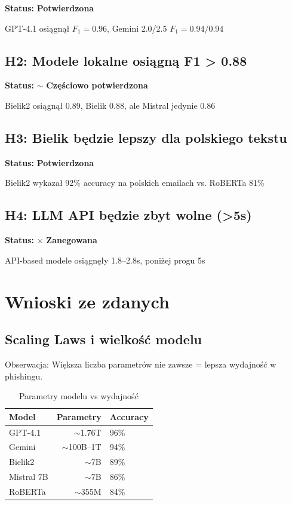 \documentclass[11pt]{extreport}
\begin{document}
\textbf{Status:} \checkmark \textbf{Potwierdzona}

GPT-4.1 osiągnął $F_1 = 0.96$, Gemini 2.0/2.5 $F_1 = 0.94/0.94$

\subsection{H2: Modele lokalne osiągną F1 > 0.88}

\textbf{Status:} $\sim$ \textbf{Częściowo potwierdzona}

Bielik2 osiągnął 0.89, Bielik 0.88, ale Mistral jedynie 0.86

\subsection{H3: Bielik będzie lepszy dla polskiego tekstu}

\textbf{Status:} \checkmark \textbf{Potwierdzona}

Bielik2 wykazał 92\% accuracy na polskich emailach vs. RoBERTa 81\%

\subsection{H4: LLM API będzie zbyt wolne (>5s)}

\textbf{Status:} $\times$ \textbf{Zanegowana}

API-based modele osiągnęły 1.8--2.8s, poniżej progu 5s

\section{Wnioski ze zdanych}
\label{sec:wnioski-zdanych}

\subsection{Scaling Laws i wielkość modelu}

Obserwacja: Większa liczba parametrów nie zawsze = lepsza wydajność w phishingu.

\begin{table}[H]
\centering
\caption{Parametry modelu vs wydajność}
\label{tab:scaling}
\begin{tabular}{@{}lrl@{}}
\toprule
\textbf{Model} & \textbf{Parametry} & \textbf{Accuracy} \\ 
\midrule
GPT-4.1      & $\sim$1.76T & 96\% \\
Gemini       & $\sim$100B--1T & 94\% \\
Bielik2      & $\sim$7B   & 89\% \\
Mistral 7B   & $\sim$7B   & 86\% \\
RoBERTa      & $\sim$355M & 84\% \\
\bottomrule
\end{tabular}
\end{table}
\end{document}
